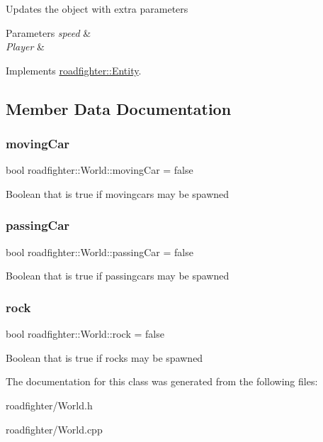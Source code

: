 Updates the object with extra parameters 
\begin{DoxyParams}{Parameters}
{\em speed} & \\
\hline
{\em Player} & \\
\hline
\end{DoxyParams}


Implements \hyperlink{classroadfighter_1_1Entity_a611ba56595dd2137d308876ba820cc09}{roadfighter\+::\+Entity}.



\subsection{Member Data Documentation}
\mbox{\label{classroadfighter_1_1World_a34349d637e9d7c8c30ad45374e99a52a}} 
\subsubsection{\texorpdfstring{moving\+Car}{movingCar}}
{\footnotesize\ttfamily bool roadfighter\+::\+World\+::moving\+Car = false}

Boolean that is true if movingcars may be spawned \mbox{\label{classroadfighter_1_1World_a64fd62cdc0a679e6cb4aa7269bcf4a21}} 
\subsubsection{\texorpdfstring{passing\+Car}{passingCar}}
{\footnotesize\ttfamily bool roadfighter\+::\+World\+::passing\+Car = false}

Boolean that is true if passingcars may be spawned \mbox{\label{classroadfighter_1_1World_a141a64ca5d10b4cc1fcb0a055b4a1fd4}} 
\subsubsection{\texorpdfstring{rock}{rock}}
{\footnotesize\ttfamily bool roadfighter\+::\+World\+::rock = false}

Boolean that is true if rocks may be spawned 

The documentation for this class was generated from the following files\+:\begin{DoxyCompactItemize}
\item 
roadfighter/World.\+h\item 
roadfighter/World.\+cpp\end{DoxyCompactItemize}
